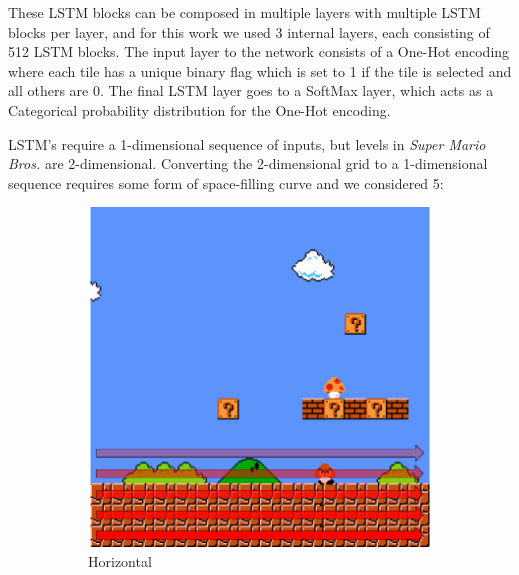 \documentclass[12pt]{report}
\begin{document}
These LSTM blocks can be composed in multiple layers with multiple LSTM blocks per layer, and for this work we used 3 internal layers, each consisting of 512 LSTM blocks.  The input layer to the network consists of a One-Hot encoding where each tile has a unique binary flag which is set to 1 if the tile is selected and all others are 0.  The final LSTM layer goes to a SoftMax layer, which acts as a Categorical probability distribution for the One-Hot encoding.  

LSTM's require a 1-dimensional sequence of inputs, but levels in \textit{Super Mario Bros.} are 2-dimensional.  Converting the 2-dimensional grid to a 1-dimensional sequence requires some form of space-filling curve and we considered 5: 

\begin{figure}[ht]
\centering
    \begin{subfigure}[t]{0.18\textwidth}
    \centering
    \includegraphics[width=1\textwidth]{figures/Naive.png} 		       \caption{Horizontal}
    \label{fig:naive}
    \end{subfigure}
    \begin{subfigure}[t]{0.18\textwidth}

\end{subfigure}
\end{figure}
\end{document}
